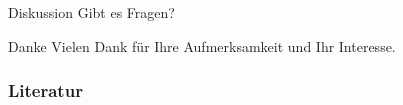 \documentclass[fleqn,11pt,aspectratio=43]{beamer}
\begin{document}
%
%
%
%
%
%
%

\begin{frame}[highlight]{Diskussion}
\centering
Gibt es Fragen?
\end{frame}

\begin{frame}{Danke}
\centering
Vielen Dank für Ihre Aufmerksamkeit und Ihr Interesse.
\end{frame}

\begin{frame}[allowframebreaks]
\frametitle{Literatur}
%

\end{frame}
\end{document}
